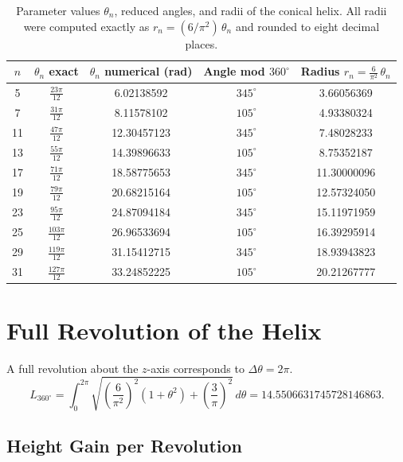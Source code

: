 \begin{table}[ht!]
\centering
\caption{Parameter values $\theta_n$, reduced angles, and radii of the
  conical helix. All radii were computed exactly as
  $r_n = (6/\pi^2)\,\theta_n$ and rounded to eight decimal places.}
\begin{tabular}{c c c c c}
\hline
$n$ 
& $\theta_n$ exact 
& $\theta_n$ numerical (rad) 
& Angle mod $360^\circ$ 
& Radius $r_n = \frac{6}{\pi^2}\,\theta_n$ \\
\hline
 5 & $\frac{23\pi}{12}$  & 6.02138592  & $345^\circ$ & 3.66056369 \\
 7 & $\frac{31\pi}{12}$  & 8.11578102  & $105^\circ$ & 4.93380324 \\
11 & $\frac{47\pi}{12}$  & 12.30457123 & $345^\circ$ & 7.48028233 \\
13 & $\frac{55\pi}{12}$  & 14.39896633 & $105^\circ$ & 8.75352187 \\
17 & $\frac{71\pi}{12}$  & 18.58775653 & $345^\circ$ & 11.30000096 \\
19 & $\frac{79\pi}{12}$  & 20.68215164 & $105^\circ$ & 12.57324050 \\
23 & $\frac{95\pi}{12}$  & 24.87094184 & $345^\circ$ & 15.11971959 \\
25 & $\frac{103\pi}{12}$ & 26.96533694 & $105^\circ$ & 16.39295914 \\
29 & $\frac{119\pi}{12}$ & 31.15412715 & $345^\circ$ & 18.93943823 \\
31 & $\frac{127\pi}{12}$ & 33.24852225 & $105^\circ$ & 20.21267777 \\
\hline
\end{tabular}
\end{table}

\section{Full Revolution of the Helix}

A full revolution about the $z$-axis corresponds to $\Delta\theta = 2\pi$.
\begin{equation}
L_{360^\circ}
= \int_{0}^{2\pi}
\sqrt{
\left(\frac{6}{\pi^2}\right)^2(1+\theta^2)
+ \left(\frac{3}{\pi}\right)^2
}\, d\theta
= \boxed{14.5506631745728146863}.
\end{equation}

\subsection{Height Gain per Revolution}

